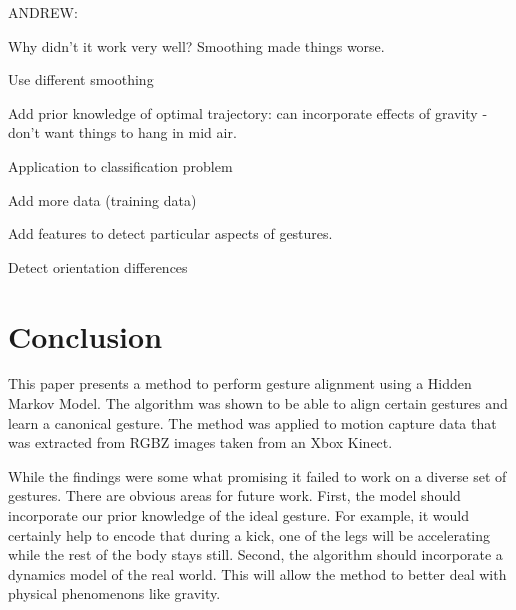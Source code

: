 \documentclass{article}
\begin{document}
ANDREW:

Why didn't it work very well? Smoothing made things worse.

Use different smoothing

Add prior knowledge of optimal trajectory: can incorporate effects of gravity
- don't want things to hang in mid air.

Application to classification problem

Add more data (training data)

Add features to detect particular aspects of gestures.

Detect orientation differences



\section{Conclusion}




This paper presents a method to perform gesture alignment using a Hidden
Markov Model. The algorithm was shown to be able to align certain gestures and
learn a canonical gesture. The method was applied to motion capture data that
was extracted from RGBZ images taken from an Xbox Kinect.

While the findings were some what promising it failed to work on a diverse set
of gestures. There are obvious areas for future work. First, the model should
incorporate our prior knowledge of the ideal gesture. For example, it would
certainly help to encode that during a kick, one of the legs will be
accelerating while the rest of the body stays still. Second, the algorithm
should incorporate a dynamics model of the real world. This will allow the
method to better deal with physical phenomenons like gravity.







\end{document}
